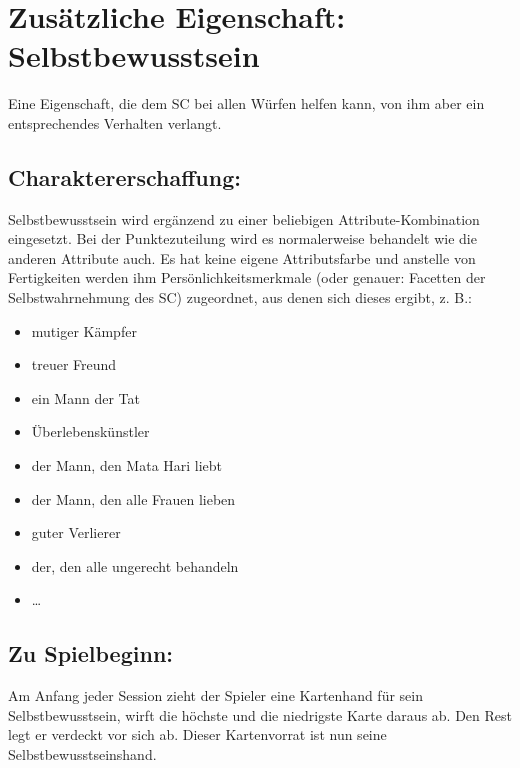 \section{Zusätzliche Eigenschaft: Selbstbewusstsein}
Eine Eigenschaft, die dem SC bei allen Würfen helfen kann, von ihm aber ein entsprechendes Verhalten verlangt.

\subsection{Charaktererschaffung:}

Selbstbewusstsein wird ergänzend zu einer beliebigen Attribute-Kombination eingesetzt. Bei der Punktezuteilung wird es normalerweise behandelt wie die anderen Attribute auch. Es hat keine eigene Attributsfarbe und anstelle von Fertigkeiten werden ihm Persönlichkeitsmerkmale (oder genauer: Facetten der Selbstwahrnehmung des SC) zugeordnet, aus denen sich dieses ergibt, z. B.:

\begin{itemize}
\item mutiger Kämpfer
\item treuer Freund
\item ein Mann der Tat
\item Überlebenskünstler
\item der Mann, den Mata Hari liebt
\item der Mann, den alle Frauen lieben
\item guter Verlierer
\item der, den alle ungerecht behandeln
\item \dots
\end{itemize}

\subsection{Zu Spielbeginn:}
Am Anfang jeder Session zieht der Spieler eine Kartenhand für sein Selbstbewusstsein, wirft die höchste und die niedrigste Karte daraus ab. Den Rest legt er verdeckt vor sich ab. Dieser Kartenvorrat ist nun seine Selbstbewusstseinshand.

